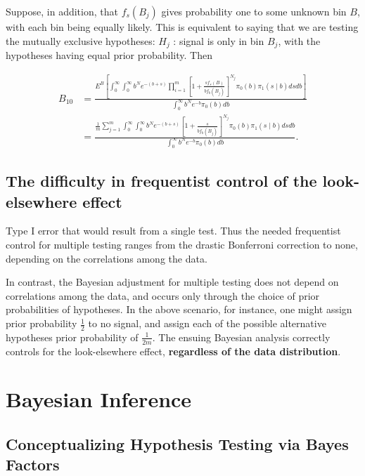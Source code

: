 \documentclass[11pt]{article}
\begin{document}
Suppose, in addition, that $f_{s}\left(B_{j}\right)$ gives probability one to some unknown bin $B$, with each bin being equally likely. This is equivalent to saying that we are testing the mutually exclusive hypotheses: $H_{j}$ : signal is only in bin $B_{j}$, with the hypotheses having equal prior probability. Then

\begin{equation}
    \begin{aligned}
    B_{10} &=\frac{E^{B}\left[\int_{0}^{\infty} \int_{0}^{\infty} b^{N} e^{-(b+s)} \prod_{i=1}^{m}\left[1+\frac{s f_{s}(B)}{b f_{b}\left(B_{j}\right)}\right]^{N_{j}} \pi_{0}(b) \pi_{1}(s \mid b) d s d b\right]}{\int_{0}^{\infty} b^{N} e^{-b} \pi_{0}(b) d b} \\
    &=\frac{\frac{1}{m} \sum_{j=1}^{m} \int_{0}^{\infty} \int_{0}^{\infty} b^{N} e^{-(b+s)}\left[1+\frac{s}{b f_{b}\left(B_{j}\right)}\right]^{N_{j}} \pi_{0}(b) \pi_{1}(s \mid b) d s d b}{\int_{0}^{\infty} b^{N} e^{-b} \pi_{0}(b) d b} .
\end{aligned}
\end{equation}

\subsection{The difficulty in frequentist control of the look-elsewhere effect}

Type I error that would result from a single test. Thus the needed frequentist control for multiple testing ranges from the drastic Bonferroni correction to none, depending on the correlations among the data.

In contrast, the Bayesian adjustment for multiple testing does not depend on correlations among the data, and occurs only through the choice of prior probabilities of hypotheses. In the above scenario, for instance, one might assign prior probability $\frac{1}{2}$ to no signal, and assign each of the possible alternative hypotheses prior probability of $\frac{1}{2 m}$. The ensuing Bayesian analysis correctly controls for the look-elsewhere effect, \textbf{regardless of the data distribution}.

\section{Bayesian Inference}

\subsection{Conceptualizing Hypothesis Testing via Bayes Factors}
\end{document}
